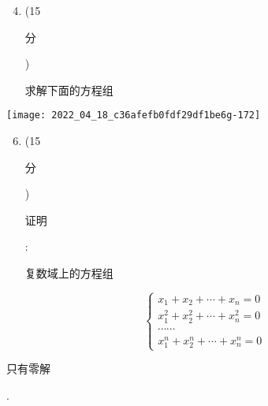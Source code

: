 \documentclass[10pt]{article}
\begin{document}
\begin{enumerate}
  \setcounter{enumi}{3}
  \item (15 \begin{CJK}{UTF8}{mj}分\end{CJK}) \begin{CJK}{UTF8}{mj}求解下面的方程组\end{CJK}
\end{enumerate}
\texttt{[image: 2022\_04\_18\_c36afefb0fdf29df1be6g-172]}

\begin{enumerate}
  \setcounter{enumi}{5}
  \item (15 \begin{CJK}{UTF8}{mj}分\end{CJK}) \begin{CJK}{UTF8}{mj}证明\end{CJK}: \begin{CJK}{UTF8}{mj}复数域上的方程组\end{CJK}
\end{enumerate}
$$
\left\{\begin{array}{l}
x_{1}+x_{2}+\cdots+x_{n}=0 \\
x_{1}^{2}+x_{2}^{2}+\cdots+x_{n}^{2}=0 \\
\cdots \cdots \\
x_{1}^{n}+x_{2}^{n}+\cdots+x_{n}^{n}=0
\end{array}\right.
$$
\begin{CJK}{UTF8}{mj}只有零解\end{CJK}.
\end{document}
